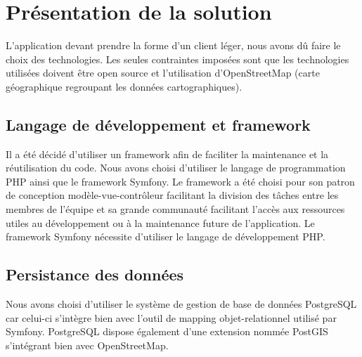 \section{Présentation de la solution}

L'application devant prendre la forme d'un client léger, nous avons dû faire le choix des technologies. Les seules contraintes imposées sont que les technologies utilisées doivent être open source et l'utilisation d'OpenStreetMap (carte géographique regroupant les données cartographiques).

\subsection{Langage de développement et framework}
Il a été décidé d'utiliser un framework afin de faciliter la maintenance et la réutilisation du code.
Nous avons choisi d'utiliser le langage de programmation PHP ainsi que le framework Symfony. Le framework a été choisi pour son patron de conception modèle-vue-contrôleur facilitant la division des tâches entre les membres de l'équipe et sa grande communauté facilitant l'accès aux ressources utiles au développement ou à la maintenance future de l'application.
Le framework Symfony nécessite d'utiliser le langage de développement PHP. 

\subsection{Persistance des données}
Nous avons choisi d'utiliser le système de gestion de base de données PostgreSQL car celui-ci s'intègre bien avec l'outil de mapping objet-relationnel utilisé par Symfony. PostgreSQL dispose également d'une extension nommée PostGIS s'intégrant bien avec OpenStreetMap.